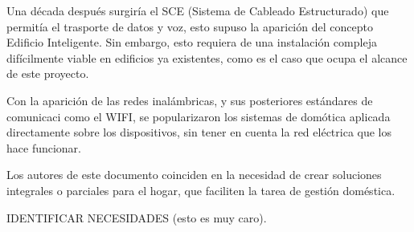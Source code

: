 Una década después surgiría el SCE (Sistema de Cableado Estructurado) que permitía el trasporte de datos y voz, esto supuso la aparición del concepto Edificio Inteligente. Sin embargo, esto requiera de una instalación compleja difícilmente viable en edificios ya existentes, como es el caso que ocupa el alcance de este proyecto.

Con la aparición de las redes inalámbricas, y sus posteriores estándares de comunicaci como el WIFI, se popularizaron los sistemas de domótica aplicada directamente sobre los dispositivos, sin tener en cuenta la red eléctrica que los hace funcionar.

Los autores de este documento coinciden en la necesidad de crear soluciones integrales o parciales para el hogar, que faciliten la tarea de gestión doméstica.

IDENTIFICAR NECESIDADES (esto es muy caro).
